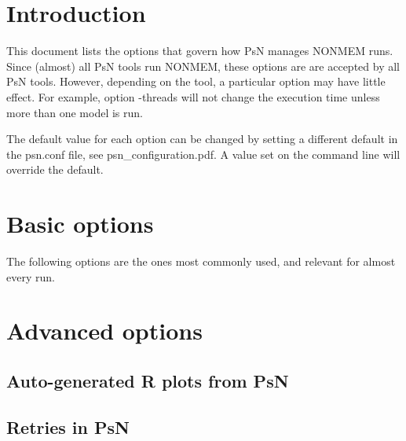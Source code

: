 



\maketitle
\newcommand{\guidetoolname}{<toolname>}

\section{Introduction}
This document lists the options that govern how PsN manages NONMEM runs. Since (almost) all PsN tools run NONMEM, these options are 
are accepted by all PsN tools. However, depending on the tool, a particular option may have little effect. For example, option -threads will not change the execution time unless more than one model is run. 

The default value for each option can be changed by setting a different default in the psn.conf file, see psn\_configuration.pdf. A value set on the command line will override the default.

\section{Basic options}
The following options are the ones most commonly used, and relevant for almost every run.


\section{Advanced options}
\subsection{Auto-generated R plots from PsN}
\newcommand{\rplotsconditions}{
Most default templates depend on a couple of R libraries. The R-scripts subdirectory contains, in addition to all the default templates, a script required\_packages.R that can be run to install all the packages used by one or more of the default templates.
If the required R libraries for a particular template are not installed then no pdf will be generated. Check the .Rout file in the main run directory for error messages.
}


\subsection{Retries in PsN}


